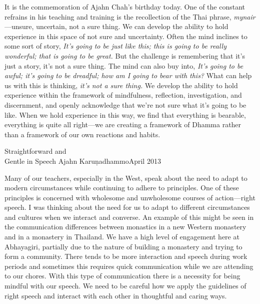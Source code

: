 It is the commemoration of Ajahn Chah's birthday today. One of the 
constant refrains in his teaching and training is the recollection of 
the Thai phrase, \emph{mynair}---unsure, uncertain, not a sure thing. 
We can develop the ability to hold experience in this space of not sure 
and uncertainty. Often the mind inclines to some sort of story, 
\emph{It's going to be just like this; this is going to be really 
wonderful; that is going to be great.} But the challenge is remembering 
that it's just a story, it's not a sure thing. The mind can also buy 
into, \emph{It's going to be awful; it's going to be dreadful; how am I 
going to bear with this?} What can help us with this is thinking, 
\emph{it's not a sure thing.} We develop the ability to hold experience 
within the framework of mindfulness, reflection, investigation, and 
discernment, and openly acknowledge that we're not sure what it's going 
to be like. When we hold experience in this way, we find that 
everything is bearable, everything is quite all right---we are creating 
a framework of Dhamma rather than a framework of our own reactions and 
habits.

{Straightforward and\\Gentle in Speech}
{Ajahn Karuṇadhammo}{April 2013}

Many of our teachers, especially in the West, speak about the need to 
adapt to modern circumstances while continuing to adhere to principles. 
One of these principles is concerned with wholesome and unwholesome 
courses of action---right speech. I was thinking about the need for us 
to adapt to different circumstances and cultures when we interact and 
converse. An example of this might be seen in the communication 
differences between monastics in a new Western monastery and in a 
monastery in Thailand. We have a high level of engagement here at 
Abhayagiri, partially due to the nature of building a monastery and 
trying to form a community. There tends to be more interaction and 
speech during work periods and sometimes this requires quick 
communication while we are attending to our chores. With this type of 
communication there is a necessity for being mindful with our speech. 
We need to be careful how we apply the guidelines of right speech and 
interact with each other in thoughtful and caring ways.

